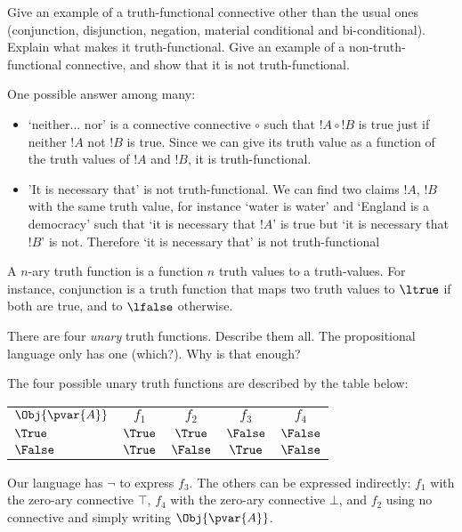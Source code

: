 \documentclass[../../../include/open-logic-section]{subfiles}
\begin{document}


\begin{prob}
    \citep[1.1 item 1]{MacFarlane-2020-PhilosophicalLogicContemporary}
    Give an example of a truth-functional connective other than the
usual ones (conjunction, disjunction, negation, material conditional
and bi-conditional). Explain what makes it truth-functional. Give an
example of a non-truth-functional connective, and show that it is not
truth-functional.

    \begin{ans} One possible answer among many:
        \begin{itemize}
        \item `neither... nor' is a connective connective $\circ$ such
        that $!A\circ!B$ is true just if neither $!A$ not $!B$ is
        true. Since we can give its truth value as a function of the
        truth values of $!A$ and $!B$, it is truth-functional.
        \item 'It is necessary that' is not truth-functional. We can
        find two claims $!A$, $!B$ with the same truth value, for
        instance `water is water' and `England is a democracy' such
        that `it is necessary that $!A$' is true but `it is necessary
        that $!B$' is not. Therefore `it is necessary that' is not
        truth-functional
    \end{itemize}
    
    \end{ans}
\end{prob}

\begin{prob}
    A $n$-ary truth function is a function $n$ truth values to
    a truth-values. For instance, conjunction is a truth function that
    maps two truth values to $\ltrue$ if both are true, and to $\lfalse$
    otherwise.

    There are four \emph{unary} truth functions. Describe them all. 
    The propositional language only has one (which?). Why is that enough?

    \begin{ans}
     The four possible unary truth functions are described by the 
     table below:

        \bigskip
        \begin{tabular}{l|cccc}
            $\Obj{\pvar{A}}$    & $f_1$   & $f_2$   & $f_3$   & $f_4$ \\
            $\True$       & $\True$ & $\True$ & $\False$ & $\False$ \\ 
            $\False$      & $\True$ & $\False$ & $\True$ & $\False$ \\
        \end{tabular}
        \bigskip

    Our language has $\lnot$ to express $f_3$. The others can be 
    expressed indirectly: $f_1$ with the zero-ary connective $\top$,
    $f_4$ with the zero-ary connective $\bot$, and $f_2$ using no 
    connective and simply writing $\Obj{\pvar{A}}$.
    \end{ans}
\end{prob}
\end{document}
